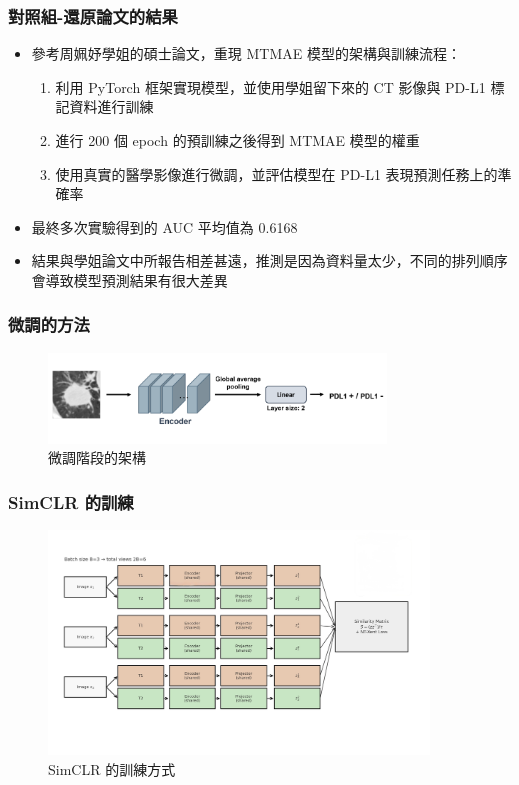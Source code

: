 \documentclass[xcolor=dvipsnames]{beamer}
\begin{document}
    \begin{frame}
        \frametitle{對照組-還原論文的結果}
        \begin{itemize}
            \item 參考周姵妤學姐的碩士論文，重現 MTMAE 模型的架構與訓練流程：
            \begin{enumerate}
                \item 利用 PyTorch 框架實現模型，並使用學姐留下來的 CT 影像與 PD-L1 標記資料進行訓練
                \item 進行 200 個 epoch 的預訓練之後得到 MTMAE 模型的權重
                \item 使用真實的醫學影像進行微調，並評估模型在 PD-L1 表現預測任務上的準確率
            \end{enumerate}

            \item 最終多次實驗得到的 AUC 平均值為 0.6168
            \item 結果與學姐論文中所報告相差甚遠，推測是因為資料量太少，不同的排列順序會導致模型預測結果有很大差異
        \end{itemize}
    \end{frame}

    \begin{frame}
        \frametitle{微調的方法}
        \begin{figure}
            \centering
            \includegraphics[width=0.8\textwidth]{src/finetune.png}
            \caption{微調階段的架構}
            \label{fig:finetune_architecture}
        \end{figure}
    \end{frame}

    \begin{frame}
        \frametitle{SimCLR 的訓練}
        \begin{figure}
            \centering
            \includegraphics[width=0.9\textwidth]{src/SimCLR_framework.jpg}
            \caption{SimCLR 的訓練方式}
            \label{fig:simclr_training_process}
        \end{figure}
    \end{frame}
\end{document}
